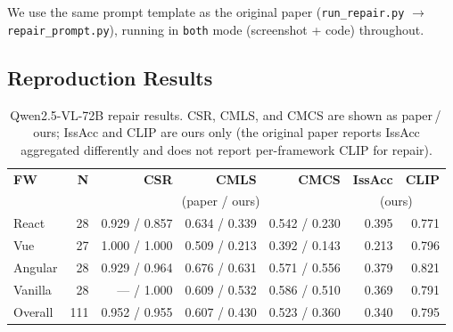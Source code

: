 \documentclass[11pt]{article}
\begin{document}
We use the same prompt template as the original paper (\texttt{run\_repair.py} $\to$ \texttt{repair\_prompt.py}), running in \texttt{both} mode (screenshot + code) throughout. 
 
\subsection{Reproduction Results}
\begin{table}[t]
\centering
\small
\setlength{\tabcolsep}{4pt}
\begin{tabular}{lrrrrrr}
\toprule
\textbf{FW} & \textbf{N} & \textbf{CSR} & \textbf{CMLS} & \textbf{CMCS} & \textbf{IssAcc} & \textbf{CLIP} \\
 & & \multicolumn{3}{c}{\footnotesize (paper / ours)} & \multicolumn{2}{c}{\footnotesize (ours)} \\
\midrule
React   & 28 & 0.929 / 0.857 & 0.634 / 0.339 & 0.542 / 0.230 & 0.395 & 0.771 \\
Vue     & 27 & 1.000 / 1.000 & 0.509 / 0.213 & 0.392 / 0.143 & 0.213 & 0.796 \\
Angular & 28 & 0.929 / 0.964 & 0.676 / 0.631 & 0.571 / 0.556 & 0.379 & 0.821 \\
Vanilla & 28 & ---\phantom{0} / 1.000 & 0.609 / 0.532 & 0.586 / 0.510 & 0.369 & 0.791 \\
\midrule
Overall & 111 & 0.952 / 0.955 & 0.607 / 0.430 & 0.523 / 0.360 & 0.340 & 0.795 \\
\bottomrule
\end{tabular}
\caption{Qwen2.5-VL-72B repair results. CSR, CMLS, and CMCS are shown as paper\,/\,ours; IssAcc and CLIP are ours only (the original paper reports IssAcc aggregated differently and does not report per-framework CLIP for repair).}
\label{tab:72b}
\end{table}
\end{document}
